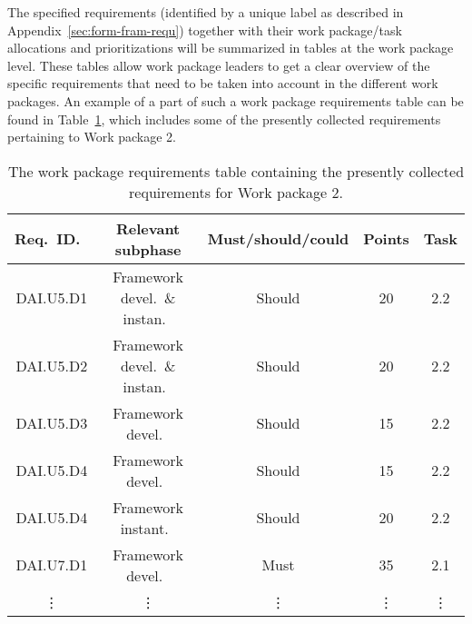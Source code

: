 
The specified requirements (identified by a unique label as described in Appendix~\ref{sec:form-fram-requ}) together
with their work package/task allocations and prioritizations will be summarized in
tables at the work package level. These tables allow work package leaders to get a clear overview of the specific
requirements that need to be taken into account in the different work packages. An example of a part of such a work
package requirements table can be found
in Table~\ref{tab:WP2-requirements}, which includes some of the presently collected requirements pertaining to Work package 2. 


\begin{table}[htbp]
  \centering
  \begin{tabular}{|c|c|c|c|c|}
    \hline
    Req.\ ID.\ & Relevant subphase & Must/should/could & Points & Task \\ \hline\hline
    DAI.U5.D1 & Framework devel.\ \& instan.\ & Should & 20 & 2.2  \\
    DAI.U5.D2 & Framework devel.\ \& instan.\ & Should & 20 & 2.2  \\
    DAI.U5.D3 & Framework devel.\ & Should & 15 & 2.2  \\
    DAI.U5.D4 & Framework devel.\ & Should & 15 & 2.2  \\
    DAI.U5.D4 & Framework instant.\ & Should & 20 & 2.2  \\
    DAI.U7.D1 & Framework devel.\ & Must & 35 & 2.1 \\
   \vdots & \vdots  & \vdots & \vdots & \vdots \\ \hline\hline
  \end{tabular}
  
  \caption{The work package requirements table containing the presently collected requirements for Work package 2.}
  \label{tab:WP2-requirements}
\end{table}



